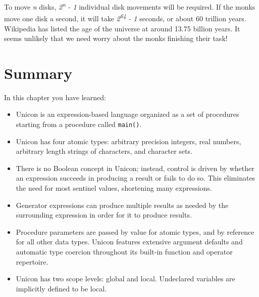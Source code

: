 To move \textit{n} disks,
\textit{2}\textit{\textsuperscript{n}}\textit{ - 1} individual disk
movements will be required. If the monks move one disk a second, it
will take \textit{2}\textit{\textsuperscript{64}}\textit{ - 1}
seconds, or about 60 trillion years. Wikipedia has listed the age of
the universe at around 13.75 billion years. It seems unlikely
that we need worry about the monks finishing their task!

\section*{Summary}

In this chapter you have learned:

\begin{itemize}\itemsep0pt
\item Unicon is an expression-based language organized as a set of
procedures starting from a procedure called \texttt{main()}.

\item Unicon has four atomic types: arbitrary precision integers, real
numbers, arbitrary length strings of characters, and character sets.

\item There is no Boolean concept in Unicon; instead, control is driven
by whether an expression succeeds in producing a result or
fails to do so. This eliminates the need for most
sentinel values, shortening many expressions.

\item {}Generator expressions can produce multiple
results as needed by the surrounding expression in order for it to
produce results.

\item Procedure parameters are passed by value for atomic types, and by
reference for all other data types. Unicon features extensive argument
defaults and automatic type coercion throughout its built-in function
and operator repertoire.

\item Unicon has two scope levels: global and local. Undeclared
variables are implicitly defined to be local.
\end{itemize}

\bigskip
